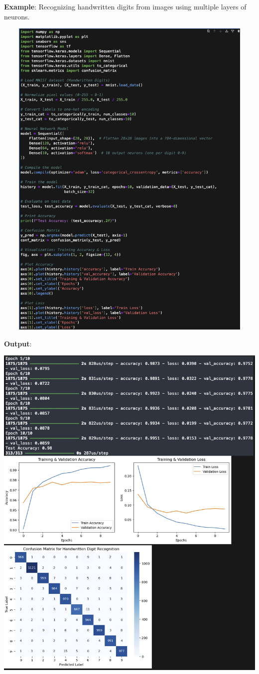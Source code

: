 \documentclass{article}
\begin{document}
\begin{itemize}
\begin{itemize}
    \textbf{Example}: Recognizing handwritten digits from images using multiple layers of neurons.

    \includegraphics[width=14cm,height=16cm]{Neural.png}

\newpage
\textbf{Output}:

\includegraphics[width=14cm,height=12
cm]{Neural_Output.png}
    \end{itemize}
\end{itemize}
\newpage
\end{document}
